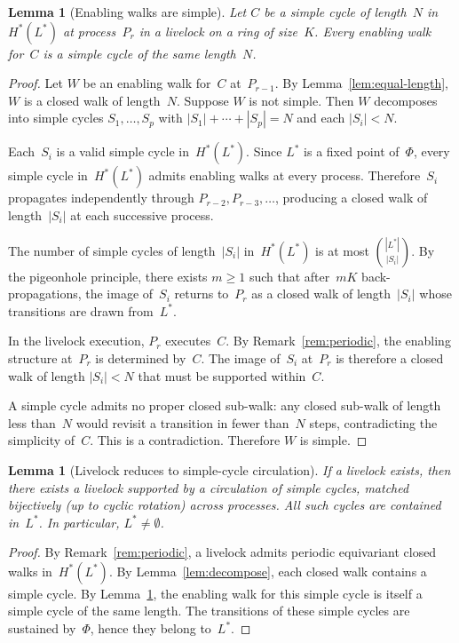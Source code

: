 \documentclass{article}
\newtheorem{lemma}[theorem]{Lemma}
\newcommand{\Hstar}{H^{*}}
\newcommand{\Lstar}{L^{*}}
\begin{document}
\begin{lemma}[Enabling walks are simple]
\label{lem:walk-simple}
Let $C$ be a simple cycle of length~$N$ in~$\Hstar(\Lstar)$
at process~$P_r$ in a livelock on a ring of size~$K$.
Every enabling walk for~$C$ is a simple cycle of the
same length~$N$.
\end{lemma}

\begin{proof}
Let $W$ be an enabling walk for~$C$ at~$P_{r-1}$.
By Lemma~\ref{lem:equal-length}, $W$ is a closed walk
of length~$N$.
Suppose $W$ is not simple.
Then $W$ decomposes into simple cycles $S_1, \ldots, S_p$
with $|S_1| + \cdots + |S_p| = N$ and each $|S_i| < N$.

Each~$S_i$ is a valid simple cycle in~$\Hstar(\Lstar)$.
Since $\Lstar$ is a fixed point of~$\Phi$, every simple
cycle in~$\Hstar(\Lstar)$ admits enabling walks at every
process.
Therefore~$S_i$ propagates independently through
$P_{r-2}, P_{r-3}, \ldots$, producing a closed walk of
length~$|S_i|$ at each successive process.

The number of simple cycles of length~$|S_i|$
in~$\Hstar(\Lstar)$ is at most $\binom{|\Lstar|}{|S_i|}$.
By the pigeonhole principle, there exists $m \geq 1$ such
that after~$mK$ back-propagations, the image of~$S_i$
returns to~$P_r$ as a closed walk of length~$|S_i|$
whose transitions are drawn from~$\Lstar$.

In the livelock execution, $P_r$ executes~$C$.
By Remark~\ref{rem:periodic}, the enabling structure
at~$P_r$ is determined by~$C$.
The image of~$S_i$ at~$P_r$ is therefore a closed walk
of length $|S_i| < N$ that must be supported within~$C$.

A simple cycle admits no proper closed sub-walk:
any closed sub-walk of length less than~$N$ would revisit
a transition in fewer than~$N$ steps,
contradicting the simplicity of~$C$.
This is a contradiction.
Therefore $W$ is simple.
\end{proof}

\begin{lemma}[Livelock reduces to simple-cycle circulation]
\label{lem:reduction}
If a livelock exists, then there exists a livelock supported
by a circulation of simple cycles, matched bijectively
(up to cyclic rotation) across processes.
All such cycles are contained in~$\Lstar$.
In particular, $\Lstar \neq \emptyset$.
\end{lemma}

\begin{proof}
By Remark~\ref{rem:periodic}, a livelock admits periodic
equivariant closed walks in~$\Hstar(\Lstar)$.
By Lemma~\ref{lem:decompose}, each closed walk contains
a simple cycle.
By Lemma~\ref{lem:walk-simple}, the enabling walk for
this simple cycle is itself a simple cycle of the same length.
The transitions of these simple cycles are sustained
by~$\Phi$, hence they belong to~$\Lstar$.
\end{proof}
\end{document}
